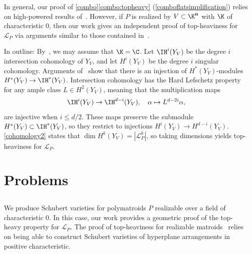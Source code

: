 \begin{rema}
  In general, our proof of \cref{combo}\cref{combo:topheavy} (\cref{comboflatsimplification}) relies on high-powered results of~\cite{BHMPW20b}.
  However, if $P$ is realized by $V \subset \K^{\mathbf n}$ with $\K$ of characteristic 0, then our work gives an independent proof of top-heaviness for $\mathcal L_P$ via arguments similar to those contained in~\cite{HW17,BE09}.

  In outline:
  By~\cite[Proposition 6.8.11]{O11}, we may assume that $\K = \C$.
  Let $\IH^i(Y_V)$ be the degree $i$ intersection cohomology of $Y_V$, and let $H^i(Y_V)$ be the degree $i$ singular cohomology.
  Arguments of~\cite{HW17,BE09} show that there is an injection of $H^*(Y_V)$-modules $H^*(Y_V) \to \IH^*(Y_V)$.
  Intersection cohomology has the Hard Lefschetz property for any ample class $L \in H^{2}(Y_V)$, meaning that the multiplication maps
  \[
\IH^i(Y_V) \to \IH^{d-i}(Y_V), \quad \alpha \mapsto L^{d-2i} \alpha,
  \]
  are injective when $i \leq d/2$.
  These maps preserve the submodule $H^*(Y_V) \subset \IH^*(Y_V)$, so they restrict to injections $H^i(Y_V) \to H^{d-i}(Y_V)$.
  \cref{cohomology2} states that $\dim H^k(Y_V) = |\mathcal L_P^k|$, so taking dimensions yields top-heaviness for $\mathcal L_P$.
\end{rema}

\section{Problems}\label{sec:problems}
\subsection{} We produce Schubert varieties for polymatroids $P$ realizable over a field of characteristic 0.
In this case, our work provides a geometric proof of the top-heavy property for $\mathcal L_P$.
The proof of top-heaviness for realizable matroids~\cite{HW17} relies on being able to construct Schubert varieties of hyperplane arrangements in positive characteristic.
\begin{ques}
  \end{ques}

